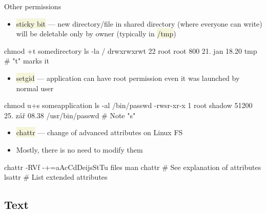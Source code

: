 \documentclass[compress, xelatex, 11pt, xcolor=svgnames, aspectratio=169, url={hyphens, lowtilde}]{beamer}
\renewcommand{\texttt}[1]{\colorbox{Beige}{{\ttfamily #1}}}
\begin{document}
\begin{frame}[fragile]{Other permissions}
	\begin{itemize}
		\item \texttt{sticky bit} --- new directory/file in shared directory (where everyone can write) will be deletable only by owner (typically in \texttt{/tmp})
	\end{itemize}
	\vfill
	\begin{bashcode}
    chmod +t somedirectory
    ls -la /
    drwxrwxrwt 22 root root 800 21. jan 18.20 tmp # "t" marks it
	\end{bashcode}
	\vfill
	\begin{itemize}
		\item \texttt{setgid} --- application can have root permission even it was launched by normal user
	\end{itemize}
	\vfill
	\begin{bashcode}
    chmod u+s someapplication
    ls -al /bin/passwd
    -rwsr-xr-x 1 root shadow 51200 25. zář 08.38 /usr/bin/passwd # Note "s"
	\end{bashcode}
	\vfill
	\begin{itemize}
		\item \texttt{chattr} --- change of advanced attributes on Linux FS
		\item Mostly, there is no need to modify them
	\end{itemize}
	\vfill
	\begin{bashcode}
    chattr -RVf -+=aAcCdDeijsStTu files
    man chattr # See explanation of attributes
    lsattr # List extended attributes
	\end{bashcode}
\end{frame}

\subsection{Text}
\end{document}
